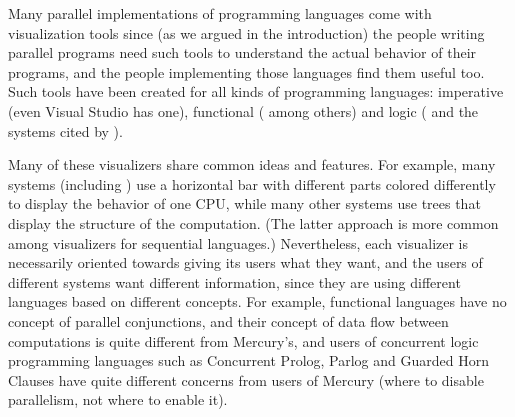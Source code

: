 % 
% 
% 
% 


Many parallel implementations of programming languages
come with visualization tools
since (as we argued in the introduction)
the people writing parallel programs
need such tools to understand the actual behavior of their programs,
and the people implementing those languages find them useful too.
Such tools have been created for all kinds of programming languages:
imperative (even Visual Studio has one),
functional
(\citet{edentraceviewer,loidl98:gransim,runciman93:profilingparfp} among others)
and logic (\citet{Foster96,vace}
and the systems cited by \citet{Gupta95parallelexecution}).

Many of these visualizers share common ideas and features.
For example, many systems (including \tscope)
use a horizontal bar with different parts colored differently
to display the behavior of one CPU,
while many other systems use trees
that display the structure of the computation.
(The latter approach is more common
among visualizers for sequential languages.)
Nevertheless, each visualizer is necessarily oriented
towards giving its users what they want,
and the users of different systems want different information,
since they are using different languages based on different concepts.
For example, functional languages have no concept of parallel conjunctions,
and their concept of data flow between computations
is quite different from Mercury's,
and users of concurrent logic programming languages
such as Concurrent Prolog, Parlog and Guarded Horn Clauses
have quite different concerns from users of Mercury
(where to disable parallelism, not where to enable it).

